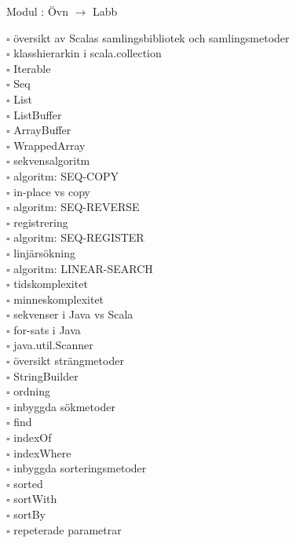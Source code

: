 
    Modul : Övn  $\rightarrow$ Labb 
    \begin{multicols}{3}\SlideFontTiny
    $\square$ översikt av Scalas samlingsbibliotek och samlingsmetoder \\
$\square$ klasshierarkin i scala.collection \\
$\square$ Iterable \\
$\square$ Seq \\
$\square$ List \\
$\square$ ListBuffer \\
$\square$ ArrayBuffer \\
$\square$ WrappedArray \\
$\square$ sekvensalgoritm \\
$\square$ algoritm: SEQ-COPY \\
$\square$ in-place vs copy \\
$\square$ algoritm: SEQ-REVERSE \\
$\square$ registrering \\
$\square$ algoritm: SEQ-REGISTER \\
$\square$ linjärsökning \\
$\square$ algoritm: LINEAR-SEARCH \\
$\square$ tidskomplexitet \\
$\square$ minneskomplexitet \\
$\square$ sekvenser i Java vs Scala \\
$\square$ for-sats i Java \\
$\square$ java.util.Scanner \\
$\square$ översikt strängmetoder \\
$\square$ StringBuilder \\
$\square$ ordning \\
$\square$ inbyggda sökmetoder \\
$\square$ find \\
$\square$ indexOf \\
$\square$ indexWhere \\
$\square$ inbyggda sorteringsmetoder \\
$\square$ sorted \\
$\square$ sortWith \\
$\square$ sortBy \\
$\square$ repeterade parametrar \\
    \end{multicols}
    
